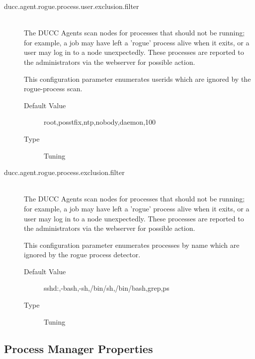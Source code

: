 \begin{description}
          \item[ducc.agent.rogue.process.user.exclusion.filter] \hfill \\
            The DUCC Agents scan nodes for processes that should not be running; for example, 
            a job may have left a 'rogue' process alive when it exits, or a user may log in to a node 
            unexpectedly. These processes are reported to the administrators via the webserver for 
            possible action. 

            This configuration parameter enumerates userids which are ignored by the rogue-process 
            scan. 
            \begin{description}
            \item[Default Value] root,posstfix,ntp,nobody,daemon,100 
            \item[Type] Tuning 
            \end{description}
            
          \item[ducc.agent.rogue.process.exclusion.filter] \hfill \\
            The DUCC Agents scan nodes for processes that should not be running; for example, 
            a job may have left a 'rogue' process alive when it exits, or a user may log in to a node 
            unexpectedly. These processes are reported to the administrators via the webserver for 
            possible action. 

            This configuration parameter enumerates processes by name which are ignored by the 
            rogue process detector. 

            \begin{description}
              \item[Default Value] sshd:,-bash,-sh,/bin/sh,/bin/bash,grep,ps 
              \item[Type] Tuning 
            \end{description}
            
          \end{description}
      


\subsection{Process Manager Properties}

